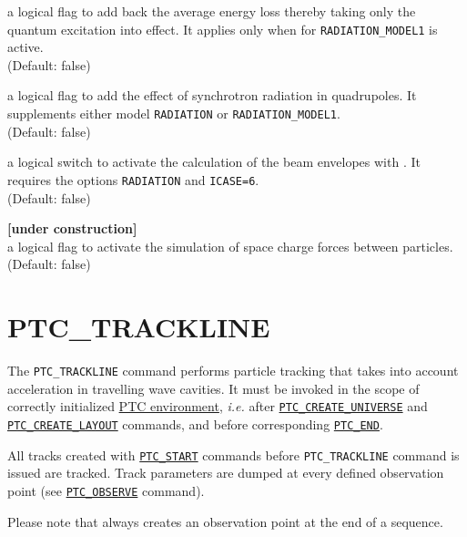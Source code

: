 \begin{madlist}
    a logical flag to add back the
   average energy loss thereby taking only the quantum excitation into
   effect. It applies only when for \texttt{RADIATION\_MODEL1} is
   active.\\
   (Default: false)

    a logical flag to add the effect of
   synchrotron radiation in quadrupoles. It supplements either model
   \texttt{RADIATION} or \texttt{RADIATION\_MODEL1}. \\
   (Default: false)

    a logical switch to activate the calculation
   of the beam envelopes with \ptc. It requires the options
   \texttt{RADIATION} and \texttt{ICASE=6}.\\
   (Default: false)

    \textbf{[under construction]}\\
     a logical flag to activate the simulation of space charge forces
     between particles. \\ (Default: false)  
\end{madlist}


\section{PTC\_TRACKLINE}
\label{sec:ptc-trackline}

The \texttt{PTC\_TRACKLINE} command performs particle tracking that takes
into account acceleration in travelling wave cavities. 
It must be invoked in the scope of correctly initialized
\hyperref[chap:ptc-setup]{PTC environment}, \textsl{i.e.} after
\hyperref[sec:ptc-create-universe]{\texttt{PTC\_CREATE\_UNIVERSE}} 
and \hyperref[sec:ptc-create-layout]{\texttt{PTC\_CREATE\_LAYOUT}} commands, and before
corresponding \hyperref[sec:ptc-end]{\texttt{PTC\_END}}. 

All tracks created with \hyperref[sec:ptc-start]{\texttt{PTC\_START}}
commands before \texttt{PTC\_TRACKLINE} command is issued are 
tracked. Track parameters are dumped at every defined observation point
(see \hyperref[sec:ptc-observe]{\texttt{PTC\_OBSERVE}} command). 

Please note that \madx always creates an observation point at the end of a
sequence.


